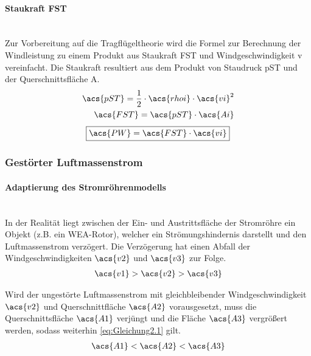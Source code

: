 \paragraph{Staukraft \acs{FST}}\mbox{}\smallskip\\
Zur Vorbereitung auf die Tragflügeltheorie wird die Formel zur Berechnung der Windleistung zu einem Produkt aus Staukraft \acs{FST} und Windgeschwindigkeit \acs{v} vereinfacht. Die Staukraft resultiert aus dem Produkt von Staudruck \acs{pST} und der Querschnittsfläche \acs{A}.
\begin{align*}
    \acs{pST} = \frac{1}{2} \cdot \acs{rhoi} \cdot \acs{vi}^2 \\
    \acs{FST} = \acs{pST} \cdot \acs{Ai}
\end{align*}
\begin{equation} \label{eq:Gleichung2.7}
    \boxed{\acs{PW} = \acs{FST} \cdot \acs{vi}}
\end{equation}

\subsubsection{Gestörter Luftmassenstrom}

\paragraph{Adaptierung des Stromröhrenmodells}\mbox{}\smallskip\\
In der Realität liegt zwischen der Ein- und Austrittsfläche der Stromröhre ein Objekt (z.B. ein WEA-Rotor), welcher ein Strömungshindernis darstellt und den Luftmassenstrom verzögert. Die Verzögerung hat einen Abfall der Windgeschwindigkeiten $\acs{v2}$ und $\acs{v3}$ zur Folge.
\begin{align*}
    \acs{v1} > \acs{v2} > \acs{v3}
\end{align*}

Wird der ungestörte Luftmassenstrom mit gleichbleibender Windgeschwindigkeit $\acs{v2}$ und Querschnittfläche $\acs{A2}$ vorausgesetzt, muss die Querschnittsfläche $\acs{A1}$ verjüngt und die Fläche $\acs{A3}$ vergrößert werden, sodass weiterhin \autoref{eq:Gleichung2.1} gilt.
\begin{align*}
    \acs{A1} < \acs{A2} < \acs{A3}
\end{align*}


